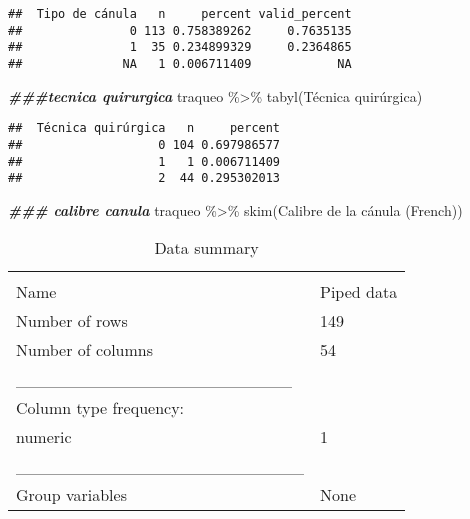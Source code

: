 \documentclass[
]{article}
\newenvironment{Shaded}{\begin{snugshade}}{\end{snugshade}}
\newcommand{\AttributeTok}[1]{\textcolor[rgb]{0.77,0.63,0.00}{#1}}
\newcommand{\DocumentationTok}[1]{\textcolor[rgb]{0.56,0.35,0.01}{\textbf{\textit{#1}}}}
\newcommand{\FunctionTok}[1]{\textcolor[rgb]{0.00,0.00,0.00}{#1}}
\newcommand{\NormalTok}[1]{#1}
\newcommand{\SpecialCharTok}[1]{\textcolor[rgb]{0.00,0.00,0.00}{#1}}
\newcommand{\StringTok}[1]{\textcolor[rgb]{0.31,0.60,0.02}{#1}}
\begin{document}
\begin{verbatim}
##  Tipo de cánula   n     percent valid_percent
##               0 113 0.758389262     0.7635135
##               1  35 0.234899329     0.2364865
##              NA   1 0.006711409            NA
\end{verbatim}

\begin{Shaded}
\begin{Highlighting}[]
\DocumentationTok{\#\#\#tecnica quirurgica}
\NormalTok{traqueo }\SpecialCharTok{\%\textgreater{}\%}
  \FunctionTok{tabyl}\NormalTok{(}\StringTok{\textasciigrave{}}\AttributeTok{Técnica quirúrgica}\StringTok{\textasciigrave{}}\NormalTok{)}
\end{Highlighting}
\end{Shaded}

\begin{verbatim}
##  Técnica quirúrgica   n     percent
##                   0 104 0.697986577
##                   1   1 0.006711409
##                   2  44 0.295302013
\end{verbatim}

\begin{Shaded}
\begin{Highlighting}[]
\DocumentationTok{\#\#\# calibre canula}
\NormalTok{traqueo }\SpecialCharTok{\%\textgreater{}\%}
  \FunctionTok{skim}\NormalTok{(}\StringTok{\textasciigrave{}}\AttributeTok{Calibre de la cánula (French)}\StringTok{\textasciigrave{}}\NormalTok{)}
\end{Highlighting}
\end{Shaded}

\begin{longtable}[]{@{}ll@{}}
\caption{Data summary}\tabularnewline
\toprule
& \\
\midrule
\endfirsthead
\toprule
& \\
\midrule
\endhead
Name & Piped data \\
Number of rows & 149 \\
Number of columns & 54 \\
\_\_\_\_\_\_\_\_\_\_\_\_\_\_\_\_\_\_\_\_\_\_\_ & \\
Column type frequency: & \\
numeric & 1 \\
\_\_\_\_\_\_\_\_\_\_\_\_\_\_\_\_\_\_\_\_\_\_\_\_ & \\
Group variables & None \\
\bottomrule
\end{longtable}
\end{document}
